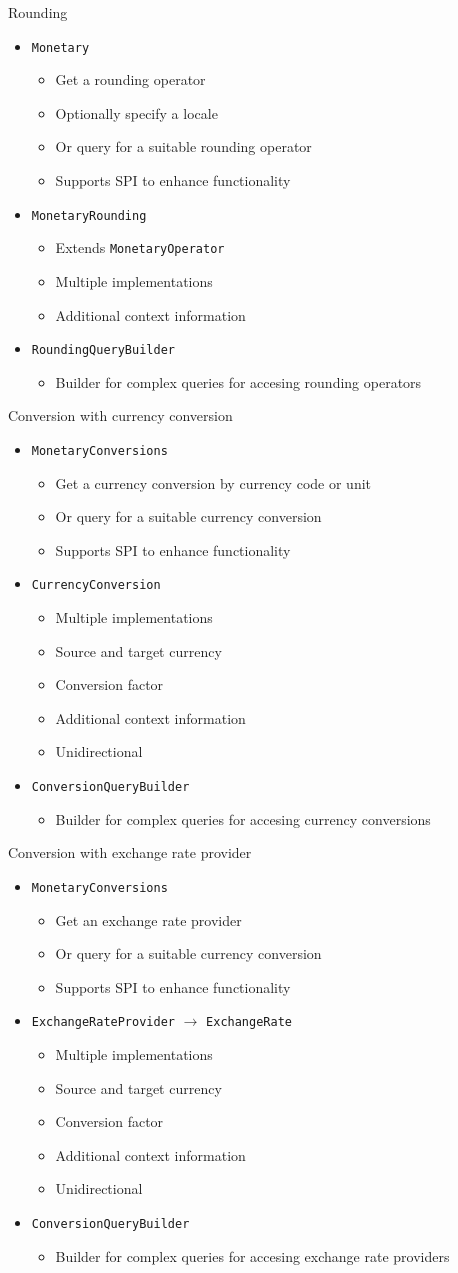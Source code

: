 \documentclass{beamer}
\newcommand{\code}[1]{\texttt{#1}}
\newcommand{\slideItems}[1]{
	\begin{itemize}
		#1
	\end{itemize}
}
\newcommand{\slide}[2]{
	\begin{frame}{#1}
		#2
	\end{frame}
}
\begin{document}
\slide{Rounding}{
	\slideItems{
		\item \code{Monetary}
			\slideItems{
				\item Get a rounding operator
				\item Optionally specify a locale
				\item Or query for a suitable rounding operator
				\item Supports SPI to enhance functionality
			}
		\item \code{MonetaryRounding}
			\slideItems{
				\item Extends \code{MonetaryOperator}
				\item Multiple implementations
				\item Additional context information
			}
		\item \code{RoundingQueryBuilder}
			\slideItems{
				\item Builder for complex queries for accesing rounding operators
			}
	}
}

\slide{Conversion with currency conversion}{
	\slideItems{
		\item \code{MonetaryConversions}
			\slideItems{
				\item Get a currency conversion by currency code or unit
				\item Or query for a suitable currency conversion
				\item Supports SPI to enhance functionality
			}
		\item \code{CurrencyConversion}
			\slideItems{
				\item Multiple implementations
				\item Source and target currency
				\item Conversion factor
				\item Additional context information
				\item Unidirectional
			}
		\item \code{ConversionQueryBuilder}
			\slideItems{
				\item Builder for complex queries for accesing currency conversions
			}
	}
}

\slide{Conversion with exchange rate provider}{
	\slideItems{
		\item \code{MonetaryConversions}
			\slideItems{
				\item Get an exchange rate provider
				\item Or query for a suitable currency conversion
				\item Supports SPI to enhance functionality
			}
		\item \code{ExchangeRateProvider} $\rightarrow$ \code{ExchangeRate}
			\slideItems{
				\item Multiple implementations
				\item Source and target currency
				\item Conversion factor
				\item Additional context information
				\item Unidirectional
			}
		\item \code{ConversionQueryBuilder}
			\slideItems{
				\item Builder for complex queries for accesing exchange rate providers
			}
	}
}
\end{document}

